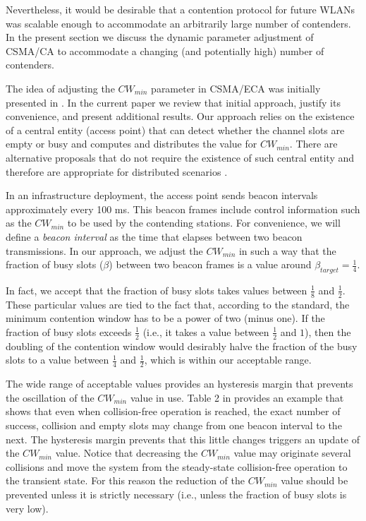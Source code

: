 \documentclass[journal]{IEEEtran}
\begin{document}
Nevertheless, it would be desirable that a contention protocol for future WLANs was scalable enough to accommodate an arbitrarily large number of contenders. In the present section we discuss the dynamic parameter adjustment of CSMA/CA to accommodate a changing (and potentially high) number of contenders.

The idea of adjusting the $CW_{min}$ parameter in CSMA/ECA was initially presented in \cite{barcelo2010dpa}. In the current paper we review that initial approach, justify its convenience, and present additional results. Our approach relies on the existence of a central entity (access point) that can detect whether the channel slots are empty or busy and computes and distributes the value for $CW_{min}$. There are alternative proposals that do not require the existence of such central entity and therefore are appropriate for distributed scenarios \cite{fang2009dlm}.

In an infrastructure deployment, the access point sends beacon intervals approximately every 100 ms. This beacon frames include control information such as the $CW_{min}$ to be used by the contending stations. For convenience, we will define a \emph{beacon interval} as the time that elapses between two beacon transmissions. In our approach, we adjust the $CW_{min}$ in such a way that the fraction of busy slots ($\beta$) between two beacon frames is a value around $\beta_{target}= \frac{1}{4}$. 

In fact, we accept that the fraction of busy slots takes values between $\frac{1}{8}$ and $\frac{1}{2}$. These particular values are tied to the fact that, according to the standard, the minimum contention window has to be a power of two (minus one). If the fraction of busy slots exceeds $\frac{1}{2}$ (i.e., it takes a value between $\frac{1}{2}$ and $1$), then the doubling of the contention window would desirably halve the fraction of the busy slots to a value between $\frac{1}{4}$ and $\frac{1}{2}$, which is within our acceptable range.

 The wide range of acceptable values provides an hysteresis margin that prevents the oscillation of the $CW_{min}$ value in use. Table 2 in \cite{barcelo2010dpa} provides an example that shows that even when collision-free operation is reached, the exact number of success, collision and empty slots may change from one beacon interval to the next. The hysteresis margin prevents that this little changes triggers an update of the $CW_{min}$ value. Notice that decreasing the $CW_{min}$ value may originate several collisions and move the system from the steady-state collision-free operation to the transient state. For this reason the reduction of the $CW_{min}$ value should be prevented unless it is strictly necessary (i.e., unless the fraction of busy slots is very low). 
\end{document}
